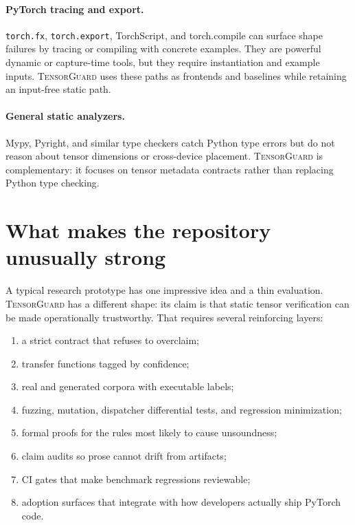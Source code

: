 \documentclass[11pt]{article}
\newcommand{\tg}{\textsc{TensorGuard}}
\begin{document}
\paragraph{PyTorch tracing and export.}
\texttt{torch.fx}, \texttt{torch.export}, TorchScript, and torch.compile can
surface shape failures by tracing or compiling with concrete examples.  They are
powerful dynamic or capture-time tools, but they require instantiation and
example inputs.  \tg{} uses these paths as frontends and baselines while
retaining an input-free static path.

\paragraph{General static analyzers.}
Mypy, Pyright, and similar type checkers catch Python type errors but do not
reason about tensor dimensions or cross-device placement.  \tg{} is
complementary: it focuses on tensor metadata contracts rather than replacing
Python type checking.

\section{What makes the repository unusually strong}

A typical research prototype has one impressive idea and a thin evaluation.
\tg{} has a different shape: its claim is that static tensor verification can be
made operationally trustworthy.  That requires several reinforcing layers:

\begin{enumerate}[leftmargin=2em]
  \item a strict contract that refuses to overclaim;
  \item transfer functions tagged by confidence;
  \item real and generated corpora with executable labels;
  \item fuzzing, mutation, dispatcher differential tests, and regression
  minimization;
  \item formal proofs for the rules most likely to cause unsoundness;
  \item claim audits so prose cannot drift from artifacts;
  \item CI gates that make benchmark regressions reviewable;
  \item adoption surfaces that integrate with how developers actually ship
  PyTorch code.
\end{enumerate}
\end{document}

